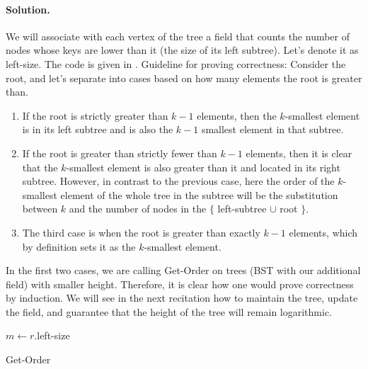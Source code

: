 \paragraph{Solution.} We will associate with each vertex of the tree a field that counts the number of nodes whose keys are lower than it (the size of its left subtree). Let's denote it as left-size. The code is given in . Guideline for proving correctness:
Consider the root, and let's separate into cases based on how many elements the root is greater than.
\begin{enumerate}
  \item If the root is strictly greater than $k-1$ elements, then the $k$-smallest element is in its left subtree and is also the $k-1$ smallest element in that subtree.
  \item If the root is greater than strictly fewer than $k-1$ elements, then it is clear that the $k$-smallest element is also greater than it and located in its right subtree. However, in contrast to the previous case, here the order of the $k$-smallest element of the whole tree in the subtree will be the substitution between $k$ and the number of nodes in the $\{$ left-subtree $\cup$ root $\}$.
  \item The third case is when the root is greater than exactly $k-1$ elements, which by definition sets it as the $k$-smallest element.
\end{enumerate}
In the first two cases, we are calling Get-Order on trees (BST with our additional field) with smaller height. Therefore, it is clear how one would prove correctness by induction. We will see in the next recitation how to maintain the tree, update the field, and guarantee that the height of the tree will remain logarithmic.
  \begin{algorithm}
       $m \leftarrow r$.left-size \\ 
        \caption{Get-Order }
\label{alg:kstat}
      \end{algorithm}
%
%
%
%

